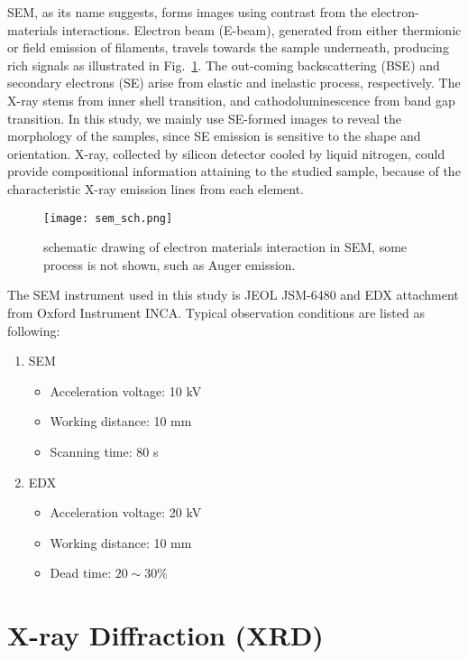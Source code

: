 SEM, as its name suggests, forms images using contrast from the electron-materials interactions. Electron beam (E-beam), generated from either thermionic or field emission of filaments, travels towards the sample underneath, producing rich signals as illustrated in Fig.~\ref{fig:ch2sem}. The out-coming backscattering (BSE) and secondary electrons (SE) arise from elastic and inelastic process, respectively. The X-ray stems from inner shell transition, and cathodoluminescence from band gap transition. In this study, we mainly use SE-formed images to reveal the morphology of the samples, since SE emission is sensitive to the shape and orientation. X-ray, collected by silicon detector cooled by liquid nitrogen, could provide compositional information attaining to the studied sample, because of the characteristic X-ray emission lines from each element. 

\begin{figure}[htb]
\centering
\texttt{[image: sem\_sch.png]}
\caption[SEM excitation volume]{schematic drawing of electron materials interaction in SEM, some process is not shown, such as Auger emission.}
\label{fig:ch2sem}
\end{figure}

The SEM instrument used in this study is JEOL JSM-6480 and EDX attachment from Oxford Instrument INCA. Typical observation conditions are listed as following:

\begin{enumerate}
\item SEM
\begin{itemize}

\item Acceleration voltage: 10 kV
\item Working distance: 10 mm
\item Scanning time: 80 s
\end{itemize}
\item EDX
\begin{itemize}

\item Acceleration voltage: 20 kV
\item Working distance: 10 mm
\item Dead time: $20\sim30$\%
\end{itemize}
\end{enumerate}

\section{X-ray Diffraction (XRD)}

